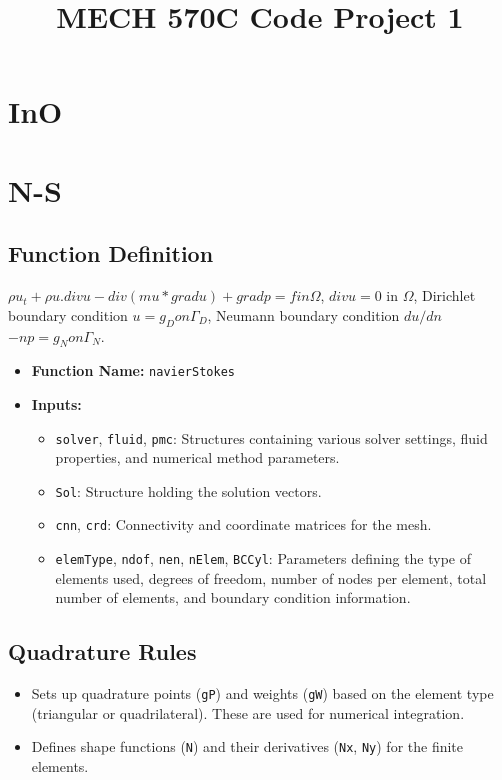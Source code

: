 \documentclass[a4paper,12pt]{article} %
\begin{document}
\title{MECH 570C Code Project 1}
\maketitle


\section{InO}


\section{N-S}
\subsection*{Function Definition}

$\rho u_t + \rho u.div u - div(mu*grad u) + grad p = f in \Omega$,    
$div u = 0$  in $\Omega$,                           
Dirichlet boundary condition        $u = g_D  on \Gamma_D$,         
Neumann boundary condition $du/dn$ $- np = g_N  on \Gamma_N$. 

\begin{itemize}
    \item \textbf{Function Name:} \texttt{navierStokes}
    \item \textbf{Inputs:} 
    \begin{itemize}
        \item \texttt{solver}, \texttt{fluid}, \texttt{pmc}: Structures containing various solver settings, fluid properties, and numerical method parameters.
        \item \texttt{Sol}: Structure holding the solution vectors.
        \item \texttt{cnn}, \texttt{crd}: Connectivity and coordinate matrices for the mesh.
        \item \texttt{elemType}, \texttt{ndof}, \texttt{nen}, \texttt{nElem}, \texttt{BCCyl}: Parameters defining the type of elements used, degrees of freedom, number of nodes per element, total number of elements, and boundary condition information.
    \end{itemize}
\end{itemize}

\subsection*{Quadrature Rules}
\begin{itemize}
    \item Sets up quadrature points (\texttt{gP}) and weights (\texttt{gW}) based on the element type (triangular or quadrilateral). These are used for numerical integration.
    \item Defines shape functions (\texttt{N}) and their derivatives (\texttt{Nx}, \texttt{Ny}) for the finite elements.
\end{itemize}
\end{document}

